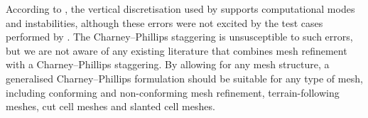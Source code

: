 According to \citet{thuburn-woolings2005}, the vertical discretisation used by \citet{yamazaki-satomura2012} supports computational modes and instabilities, although these errors were not excited by the test cases performed by \citet{yamazaki-satomura2012}.
The Charney--Phillips staggering is unsusceptible to such errors, but we are not aware of any existing literature that combines mesh refinement with a Charney--Phillips staggering.
By allowing for any mesh structure, a generalised Charney--Phillips formulation should be suitable for any type of mesh, including conforming and non-conforming mesh refinement, terrain-following meshes, cut cell meshes and slanted cell meshes.
